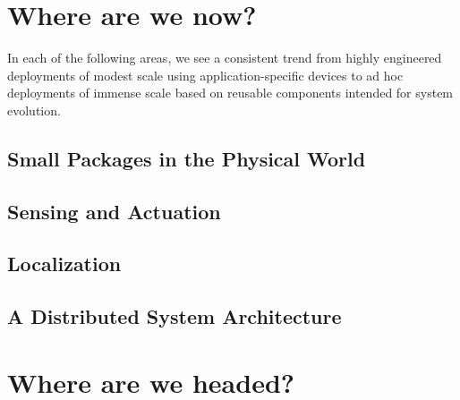 \documentclass[letterpaper,10pt]{article}
\begin{document}
\section{Where are we now?}

In each of the following areas, we see a consistent trend from highly engineered deployments of modest scale using application-specific devices to ad hoc deployments of immense scale based on reusable components intended for system evolution.

\subsection{Small Packages in the Physical World}

\subsection{Sensing and Actuation}

\subsection{Localization}

\subsection{A Distributed System Architecture}

\section{Where are we headed?}
\end{document}
